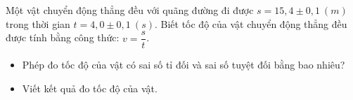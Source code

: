 


















\begin{ex}%
Một vật chuyển động thẳng đều với quãng đường đi được $s=15,4\pm 0,1 \ (m)$ trong thời gian $t=4,0\pm 0,1\ (s)$. Biết tốc độ của vật chuyển động thẳng đều được tính bằng công thức: $v=\dfrac{s}{t}$.
\begin{itemize}
\item[a.] Phép đo tốc độ của vật có sai số tỉ đối và sai số tuyệt đối bằng bao nhiêu? 
\item[b.] Viết kết quả đo tốc độ của vật.
\end{itemize}
\end{ex}


